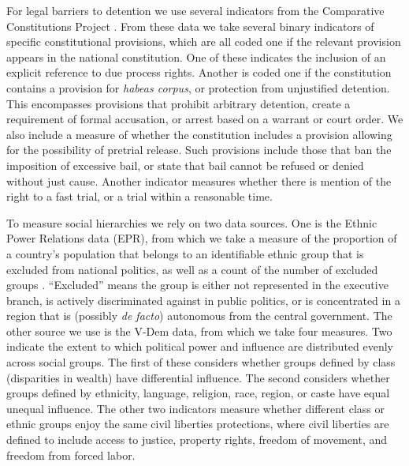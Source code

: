 \documentclass[11pt]{article}
\begin{document}
For legal barriers to detention we use several indicators from the Comparative Constitutions Project \citep{CCP2014}. From these data we take several binary indicators of specific constitutional provisions, which are all coded one if the relevant provision appears in the national constitution. One of these indicates the inclusion of an explicit reference to due process rights. Another is coded one if the constitution contains a provision for {\em habeas corpus}, or protection from unjustified detention. This encompasses provisions that prohibit arbitrary detention, create a requirement of formal accusation, or arrest based on a warrant or court order. We also include a measure of whether the constitution includes a provision allowing for the possibility of pretrial release. Such provisions include those that ban the imposition of excessive bail, or state that bail cannot be refused or denied without just cause. Another indicator measures whether there is mention of the right to a fast trial, or a trial within a reasonable time. 

To measure social hierarchies we rely on two data sources. One is the Ethnic Power Relations data (EPR), from which we take a measure of the proportion of a country's population that belongs to an identifiable ethnic group that is excluded from national politics, as well as a count of the number of excluded groups  \citep{vogt2015integrating}. ``Excluded'' means the group is either not represented in the executive branch, is actively discriminated against in public politics, or is concentrated in a region that is (possibly {\em de facto}) autonomous from the central government.  The other source we use is the V-Dem data, from which we take four measures. Two indicate the extent to which political power and influence are distributed evenly across social groups. The first of these considers whether groups defined by class (disparities in wealth) have differential influence. The second considers whether groups defined by ethnicity, language, religion, race, region, or caste have equal unequal influence. The other two indicators measure whether different class or ethnic groups enjoy the same civil liberties protections, where civil liberties are defined to include access to justice, property rights, freedom of movement, and freedom from forced labor. 
\end{document}
